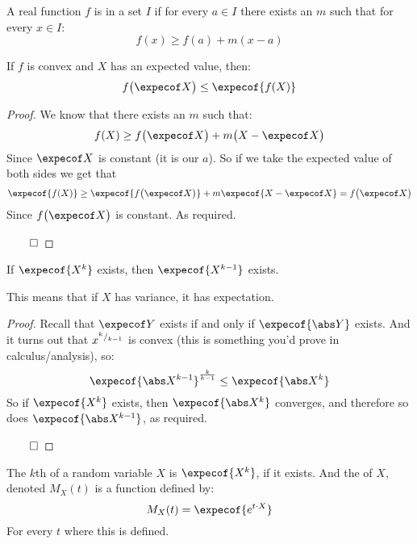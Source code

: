 \begin{defn*}

	A real function $f$ is  in a set $I$ if for every $a\in I$ there exists an $m$ such that for
	every $x\in I$:
	\[ f(x)\geq f(a) + m(x-a) \]

\end{defn*}

\begin{thrm*}

	If $f$ is convex and $X$ has an expected value, then:
	\[ f\big(\expecof X\big)\leq\expecof{f(X)} \]

\end{thrm*}

\begin{proof}

	We know that there exists an $m$ such that:
	\[ f(X) \geq f\big(\expecof X\big) + m\big(X-\expecof X\big) \]
	Since $\expecof X$ is constant (it is our $a$).
	So if we take the expected value of both sides we get that
	\[ \expecof{f(X)} \geq \expecof{f\big(\expecof X\big)} + m \expecof{X-\expecof X} = f\big(\expecof X\big) \]
	Since $f\big(\expecof X\big)$ is constant.
	As required.

	\hfill$\qed$

\end{proof}

\begin{coro*}

	If $\expecof{X^k}$ exists, then $\expecof{X^{k-1}}$ exists.

\end{coro*}

This means that if $X$ has variance, it has expectation.

\begin{proof}

	Recall that $\expecof Y$ exists if and only if $\expecof{\abs Y}$ exists.
	And it turns out that $x^{{}^{k}/{}_{k-1}}$ is convex (this is something you'd prove in calculus/analysis), so:
	\[ \expecof{\abs X^{k-1}}^{\frac k{k-1}}\leq \expecof{\abs X^k} \]
	So if $\expecof{X^k}$ exists, then $\expecof{\abs X^k}$ converges, and therefore so does $\expecof{\abs X^{k-1}}$, as required.

	\hfill$\qed$

\end{proof}

\begin{defn*}

	The $k$th  of a random variable $X$ is $\expecof{X^k}$, if it exists. And the 
	of $X$, denoted $M_X(t)$ is a function defined by:
	\[ M_X(t) = \expecof{e^{t\cdot X}} \]
	For every $t$ where this is defined.

\end{defn*}

